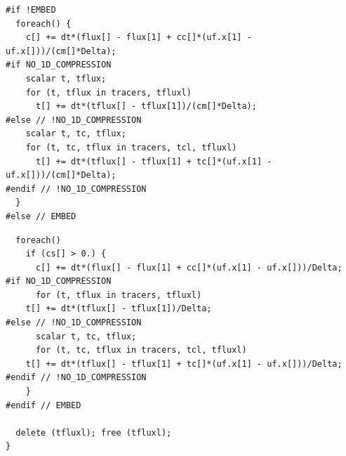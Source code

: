 \documentclass[a4paper]{article}
\newcommand{\para}[1]{\textbf{\emph{\textcolor{para}{#1}}}}
\begin{document}
\newpage
\begin{multicols}{2}
 \columnbreak
 \begin{verbatim}
#if !EMBED
  foreach() {
    c[] += dt*(flux[] - flux[1] + cc[]*(uf.x[1] - uf.x[]))/(cm[]*Delta);
#if NO_1D_COMPRESSION
    scalar t, tflux;
    for (t, tflux in tracers, tfluxl)
      t[] += dt*(tflux[] - tflux[1])/(cm[]*Delta);
#else // !NO_1D_COMPRESSION
    scalar t, tc, tflux;
    for (t, tc, tflux in tracers, tcl, tfluxl)
      t[] += dt*(tflux[] - tflux[1] + tc[]*(uf.x[1] - uf.x[]))/(cm[]*Delta);
#endif // !NO_1D_COMPRESSION
  }
#else // EMBED
 \end{verbatim}
\end{multicols}

\begin{center}
\end{center}

\begin{multicols}{2}
 \columnbreak
 \begin{verbatim}
  foreach()
    if (cs[] > 0.) {
      c[] += dt*(flux[] - flux[1] + cc[]*(uf.x[1] - uf.x[]))/Delta;
#if NO_1D_COMPRESSION
      for (t, tflux in tracers, tfluxl)
	t[] += dt*(tflux[] - tflux[1])/Delta;
#else // !NO_1D_COMPRESSION
      scalar t, tc, tflux;
      for (t, tc, tflux in tracers, tcl, tfluxl)
	t[] += dt*(tflux[] - tflux[1] + tc[]*(uf.x[1] - uf.x[]))/Delta;
#endif // !NO_1D_COMPRESSION
    }
#endif // EMBED

  delete (tfluxl); free (tfluxl);
}
 \end{verbatim}
\end{multicols}
\end{document}
